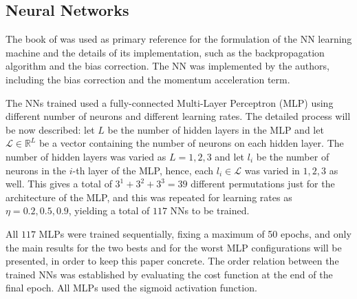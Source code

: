 \documentclass[conference]{IEEEtran}
\theoremstyle{definition}
\theoremstyle{remark}
\theoremstyle{remark}
\begin{document}
\subsection{Neural Networks}
The book of \textcite{aggarwal2018} was used as primary reference for the
formulation of the NN learning machine and the details of its implementation,
such as the backpropagation algorithm and the bias correction. The NN was
implemented by the authors, including the bias correction and the momentum
acceleration term.

The NNs trained used a fully-connected Multi-Layer Perceptron (MLP) using
different number of neurons and different learning rates. The detailed process
will be now described: let $L$ be the number of hidden layers in the MLP and let
$\mathcal{L}\in\mathbb{R}^{L}$ be a vector containing the number of neurons on
each hidden layer. The number of hidden layers was varied as $L=1,2,3$ and let
$l_i$ be the number of neurons in the $i$-th layer of the MLP, hence, each
$l_i\in\mathcal{L}$ was varied in $1,2,3$ as well. This gives a total of
$3^1+3^2+3^3=39$ different permutations just for the architecture of the MLP,
and this was repeated for learning rates as $\eta=0.2,0.5,0.9$, yielding a total
of $117$ NNs to be trained.

All $117$ MLPs were trained sequentially, fixing a maximum of 50 epochs, and
only the main results for the two bests and for the worst MLP configurations
will be presented, in order to keep this paper concrete. The order relation
between the trained NNs was established by evaluating the cost function at the
end of the final epoch. All MLPs used the sigmoid activation function.
\end{document}
